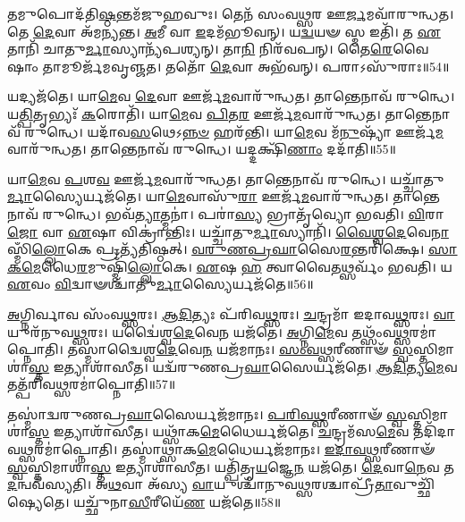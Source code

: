 𑌤𑌮𑍁𑌪𑍋𑌦᳴𑌤𑌿\-\ul{𑌷𑍍𑌠}\-𑌨𑍍𑌤𑌮᳴𑌜𑍁𑌹𑌵𑍁𑌃।
𑌤𑍇𑌨᳴ 𑌸𑌂𑌵\-\ul{𑌥𑍍𑌸}\-𑌰 𑌊\-\ul{𑌰𑍍𑌜}\-𑌮𑌵𑌾᳴𑌰𑍁𑌨𑍍𑌧𑌤।
𑌤𑍇 \ul{𑌦𑍇}\-𑌵𑌾 𑌅᳴𑌮𑌨𑍍𑌯𑌨𑍍𑌤।
\-\ul{𑌅}\-𑌮𑍀 𑌵𑌾 \ul{𑌇}\-𑌦𑌮᳴𑌭𑍂𑌵𑌨𑍍।
𑌯\-\ul{𑌦𑍍𑌵}\-𑌯𑍟 𑌸𑍍𑌮 𑌇𑌤𑌿᳴।
𑌤 \ul{𑌏}\-𑌤𑌾𑌨𑌿᳴ 𑌚𑌾𑌤𑍁\-\ul{𑌰𑍍𑌮𑌾}\-𑌸𑍍𑌯𑌾𑌨𑍍𑌯᳴𑌪𑌶𑍍𑌯𑌨𑍍।
𑌤𑌾\-\ul{𑌨𑌿} 𑌨𑌿𑌰᳴𑌵𑌪𑌨𑍍।
𑌤𑍈\-\ul{𑌰𑍇}\-𑌵𑍈𑌷𑌾𑌂 𑌤𑌾𑌮𑍂𑌰𑍍𑌜᳴𑌮𑌵𑍃𑌞𑍍𑌜𑌤।
𑌤𑌤𑍋᳴ \ul{𑌦𑍇}\-𑌵𑌾 𑌅𑌭᳴𑌵𑌨𑍍।
𑌪𑌰𑌾𑌽𑌸𑍁᳴𑌰𑌾𑌃॥54॥

𑌯𑌦𑍍𑌯𑌜᳴𑌤𑍇।
𑌯𑌾\-\ul{𑌮𑍇}\-𑌵 \ul{𑌦𑍇}\-𑌵𑌾 𑌊𑌰𑍍𑌜᳴\-\ul{𑌮}\-𑌵𑌾𑌰𑍁᳴𑌨𑍍𑌧𑌤।
𑌤𑌾𑌨𑍍𑌤𑍇𑌨𑌾𑌵᳴ 𑌰𑍁𑌨𑍍𑌧𑍇।
𑌯\-\ul{𑌤𑍍𑌪𑌿}\-𑌤𑍃𑌭𑍍𑌯𑌃᳴ \ul{𑌕}\-𑌰𑍋𑌤𑌿᳴।
𑌯𑌾\-\ul{𑌮𑍇}\-𑌵 \ul{𑌪𑌿}\-𑌤\-\ul{𑌰} 𑌊𑌰𑍍𑌜᳴\-\ul{𑌮}\-𑌵𑌾𑌰𑍁᳴𑌨𑍍𑌧𑌤।
𑌤𑌾𑌨𑍍𑌤𑍇𑌨𑌾𑌵᳴ 𑌰𑍁𑌨𑍍𑌧𑍇।
𑌯𑌦𑌾᳴𑌵\-\ul{𑌸}\-𑌥𑍇\-𑌽\-\ul{𑌨𑍍𑌨}\-\-\ul{𑍞} 𑌹𑌰᳴𑌨𑍍𑌤𑌿।
𑌯𑌾\-\ul{𑌮𑍇}\-𑌵 𑌮᳴\-\ul{𑌨𑍁}\-𑌷𑍍𑌯𑌾᳴ 𑌊𑌰𑍍𑌜᳴\-\ul{𑌮}\-𑌵𑌾𑌰𑍁᳴𑌨𑍍𑌧𑌤।
𑌤𑌾𑌨𑍍𑌤𑍇𑌨𑌾𑌵᳴ 𑌰𑍁𑌨𑍍𑌧𑍇।
𑌯𑌦𑍍𑌦𑌕𑍍𑌷𑌿᳴\-\ul{𑌣𑌾𑌂} 𑌦𑌦𑌾᳴𑌤𑌿॥55॥

𑌯𑌾\-\ul{𑌮𑍇}\-𑌵 \ul{𑌪}\-𑌶\-\ul{𑌵} 𑌊𑌰𑍍𑌜᳴\-\ul{𑌮}\-𑌵𑌾𑌰𑍁᳴𑌨𑍍𑌧𑌤।
𑌤𑌾𑌨𑍍𑌤𑍇𑌨𑌾𑌵᳴ 𑌰𑍁𑌨𑍍𑌧𑍇।
𑌯𑌚𑍍𑌚𑌾᳴𑌤𑍁\-\ul{𑌰𑍍𑌮𑌾}\-𑌸𑍍𑌯𑍈𑌰𑍍\-𑌯𑌜᳴𑌤𑍇।
𑌯𑌾\-\ul{𑌮𑍇}\-𑌵𑌾𑌸𑍁᳴\-\ul{𑌰𑌾} 𑌊𑌰𑍍𑌜᳴\-\ul{𑌮}\-𑌵𑌾𑌰𑍁᳴𑌨𑍍𑌧𑌤।
𑌤𑌾𑌨𑍍𑌤𑍇𑌨𑌾𑌵᳴ 𑌰𑍁𑌨𑍍𑌧𑍇।
𑌭𑌵᳴\-\ul{𑌤𑍍𑌯𑌾}\-𑌤𑍍𑌮𑌨𑌾॑।
𑌪𑌰𑌾॑\-\ul{𑌸𑍍𑌯} 𑌭𑍍𑌰𑌾𑌤𑍃᳴𑌵𑍍𑌯𑍋 𑌭𑌵𑌤𑌿।
\-\ul{𑌵𑌿}\-𑌰𑌾\-\ul{𑌜𑍋} 𑌵𑌾 \ul{𑌏}\-𑌷𑌾 𑌵𑌿𑌕𑍍𑌰𑌾॑𑌨𑍍𑌤𑌿𑌃।
𑌯𑌚𑍍𑌚𑌾᳴𑌤𑍁\-\ul{𑌰𑍍𑌮𑌾}\-𑌸𑍍𑌯𑌾𑌨𑌿᳴।
\-\ul{𑌵𑍈}\-\-\ul{𑌶𑍍𑌵}\-\-\ul{𑌦𑍇}\-𑌵𑍇\-\ul{𑌨𑌾}\-𑌸𑍍𑌮𑌿𑌁\-\ul{𑌲𑍍𑌲𑍋}\-𑌕𑍇 𑌪𑍍𑌰𑌤𑍍𑌯᳴𑌤𑌿𑌷𑍍𑌠𑌤𑍍।
\-\ul{𑌵}\-\-\ul{𑌰𑍁}\-\-\ul{𑌣}\-\-\ul{𑌪𑍍𑌰}\-\-\ul{𑌘𑌾}\-𑌸𑍈\-\ul{𑌰}\-𑌨𑍍𑌤𑌰𑌿᳴𑌕𑍍𑌷𑍇।
\-\ul{𑌸𑌾}\-\-\ul{𑌕}\-\-\ul{𑌮𑍇}\-𑌧𑍈\-\ul{𑌰}\-𑌮𑍁𑌷𑍍𑌮𑌿𑌁᳴\-\ul{𑌲𑍍𑌲𑍋}\-𑌕𑍇।
\-\ul{𑌏}\-𑌷 \ul{𑌹} 𑌤𑍍𑌵𑌾𑌵𑍈𑌤𑌥𑍍𑌸𑌰𑍍𑌵𑌂᳴ 𑌭𑌵𑌤𑌿।
𑌯 \ul{𑌏}\-𑌵𑌂 \ul{𑌵𑌿}\-𑌦𑍍𑌵𑌾𑍟𑌶𑍍𑌚𑌾᳴𑌤𑍁\-\ul{𑌰𑍍𑌮𑌾}\-𑌸𑍍𑌯𑍈𑌰𑍍𑌯𑌜᳴𑌤𑍇॥56॥

\-\ul{𑌅}\-𑌗𑍍𑌨𑌿𑌰𑍍𑌵𑌾𑌵 𑌸𑌂᳴𑌵\-\ul{𑌥𑍍𑌸}\-𑌰𑌃।
\-\ul{𑌆}\-\-\ul{𑌦𑌿}\-𑌤𑍍𑌯𑌃 𑌪᳴𑌰𑌿𑌵\-\ul{𑌥𑍍𑌸}\-𑌰𑌃।
\-\ul{𑌚}\-𑌨𑍍𑌦𑍍𑌰𑌮𑌾᳴ 𑌇𑌦𑌾𑌵\-\ul{𑌥𑍍𑌸}\-𑌰𑌃।
\-\ul{𑌵𑌾}\-𑌯𑍁𑌰᳴𑌨𑍁𑌵\-\ul{𑌥𑍍𑌸}\-𑌰𑌃।
𑌯𑌦𑍍𑌵𑍈॑𑌶𑍍𑌵\-\ul{𑌦𑍇}\-𑌵𑍇\-\ul{𑌨} 𑌯𑌜᳴𑌤𑍇।
\-\ul{𑌅}\-𑌗𑍍𑌨𑌿\-\ul{𑌮𑍇}\-𑌵 𑌤𑌥𑍍𑌸𑌂᳴𑌵\-\ul{𑌥𑍍𑌸}\-𑌰𑌮𑌾॑𑌪𑍍𑌨𑍋𑌤𑌿।
𑌤𑌸𑍍𑌮𑌾॑𑌦𑍍𑌵𑍈𑌶𑍍𑌵\-\ul{𑌦𑍇}\-𑌵𑍇\-\ul{𑌨} 𑌯𑌜᳴𑌮𑌾𑌨𑌃।
\-\ul{𑌸𑌂}\-\-\ul{𑌵}\-\-\ul{𑌥𑍍𑌸}\-𑌰𑍀𑌣𑌾𑍟᳴ \ul{𑌸𑍍𑌵}\-𑌸𑍍𑌤𑌿𑌮𑌾𑌶𑌾॑\-\ul{𑌸𑍍𑌤} 𑌇𑌤𑍍𑌯𑌾𑌶𑌾᳴𑌸𑍀𑌤।
𑌯𑌦𑍍𑌵᳴𑌰𑍁𑌣\-𑌪𑍍𑌰\-\ul{𑌘𑌾}\-𑌸𑍈𑌰𑍍𑌯𑌜᳴𑌤𑍇।
\-\ul{𑌆}\-\-\ul{𑌦𑌿}\-𑌤𑍍𑌯\-\ul{𑌮𑍇}\-𑌵 𑌤𑌤𑍍𑌪᳴𑌰𑌿𑌵\-\ul{𑌥𑍍𑌸}\-𑌰𑌮𑌾॑𑌪𑍍𑌨𑍋𑌤𑌿॥57॥

𑌤𑌸𑍍𑌮𑌾॑𑌦𑍍𑌵𑌰𑍁𑌣𑌪𑍍𑌰\-\ul{𑌘𑌾}\-𑌸𑍈𑌰𑍍𑌯𑌜᳴𑌮𑌾𑌨𑌃।
\-\ul{𑌪}\-\-\ul{𑌰𑌿}\-\-\ul{𑌵}\-\-\ul{𑌥𑍍𑌸}\-𑌰𑍀𑌣𑌾𑍟᳴ \ul{𑌸𑍍𑌵}\-𑌸𑍍𑌤𑌿𑌮𑌾\-𑌶𑌾॑\-\ul{𑌸𑍍𑌤} 𑌇𑌤𑍍𑌯𑌾𑌶𑌾᳴𑌸𑍀𑌤।
𑌯𑌥𑍍𑌸𑌾᳴𑌕\-\ul{𑌮𑍇}\-𑌧𑍈𑌰𑍍𑌯𑌜᳴𑌤𑍇।
\-\ul{𑌚}\-𑌨𑍍𑌦𑍍𑌰𑌮᳴𑌸\-\ul{𑌮𑍇}\-𑌵 𑌤𑌦𑌿᳴𑌦𑌾𑌵\-\ul{𑌥𑍍𑌸}\-𑌰\-𑌮𑌾॑𑌪𑍍𑌨𑍋𑌤𑌿।
𑌤𑌸𑍍𑌮𑌾॑𑌥𑍍𑌸𑌾𑌕\-\ul{𑌮𑍇}\-𑌧𑍈𑌰𑍍𑌯𑌜᳴𑌮𑌾𑌨𑌃।
\-\ul{𑌇}\-\-\ul{𑌦𑌾}\-\-\-\ul{𑌵}\-\-\ul{𑌥𑍍𑌸}\-𑌰𑍀𑌣𑌾𑍟᳴ \ul{𑌸𑍍𑌵}\-𑌸𑍍𑌤𑌿𑌮𑌾𑌶𑌾॑\-\ul{𑌸𑍍𑌤} 𑌇𑌤𑍍𑌯𑌾𑌶𑌾᳴𑌸𑍀𑌤।
𑌯𑌤𑍍𑌪𑌿᳴𑌤𑍃\-\ul{𑌯}\-𑌜𑍍𑌞𑍇\-\ul{𑌨} 𑌯𑌜᳴𑌤𑍇।
\-\ul{𑌦𑍇}\-𑌵𑌾\-\ul{𑌨𑍇}\-𑌵 𑌤\-\ul{𑌦}\-𑌨𑍍𑌵𑌵᳴𑌸𑍍𑌯𑌤𑌿।
𑌅\-\ul{𑌥}\-𑌵𑌾 𑌅᳴𑌸𑍍𑌯 \ul{𑌵𑌾}\-𑌯𑍁𑌶𑍍𑌚𑌾᳴𑌨𑍁\-𑌵\-\ul{𑌥𑍍𑌸}\-𑌰𑌶𑍍𑌚𑌾𑌪𑍍𑌰𑍀᳴\-\ul{𑌤𑌾}\-\-𑌵𑍁𑌚𑍍𑌛𑌿᳴𑌷𑍍𑌯𑍇𑌤𑍇।
𑌯𑌚𑍍𑌛𑍁᳴𑌨𑌾\-\ul{𑌸𑍀}\-𑌰𑍀𑌯𑍇᳴\-\ul{𑌣} 𑌯𑌜᳴𑌤𑍇॥58॥

